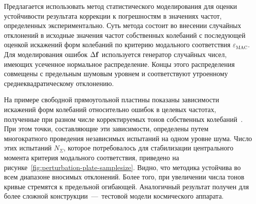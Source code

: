 Предлагается использовать метод статистического моделирования для оценки устойчивости результата коррекции к погрешностям в значениях частот, определенных экспериментально. Суть метода состоит во внесении случайных отклонений в исходные значения частот собственных колебаний с последующей оценкой искажений форм колебаний по критерию модального соответствия $ \varepsilon_{\mathrm{MAC}} $. Для моделирования ошибок $\Delta \mathbf{f} $ используется генератор случайных чисел, имеющих усеченное нормальное распределение. Концы этого распределения совмещены с предельным шумовым уровнем и соответствуют утроенному среднеквадратическому отклонению. 

На примере свободной прямоугольной пластины показаны зависимости искажений форм колебаний относительно ошибок в целевых частотах, полученные при разном числе корректируемых тонов собственных колебаний~. При этом точки, составляющие эти зависимости, определены путем многократного проведения независимых испытаний на одном уровне шума. Число этих испытаний $ N_\Sigma $, которое потребовалось для стабилизации центрального момента критерия модального соответствия, приведено на рисунке~\ref{fig:perturbation-plate-samplesize}. Видно, что методика устойчива во всем диапазоне вносимых отклонений. Более того, при увеличении числа тонов кривые стремятся к предельной огибающей. Аналогичный результат получен для более сложной конструкции~---~тестовой модели космического аппарата.

